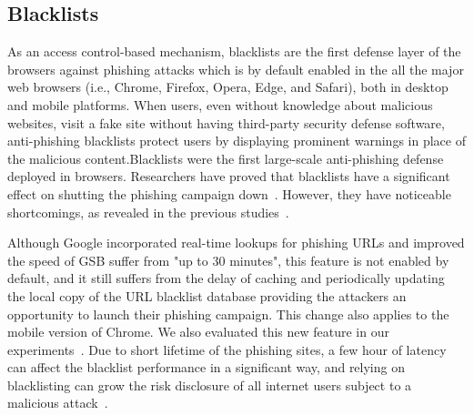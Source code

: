 \documentclass[letterpaper,twocolumn,10pt]{article}
\begin{document}
\subsection{Blacklists}

As an access control-based mechanism, blacklists are the first defense layer of the browsers against phishing attacks which is by default enabled in the all the major web browsers (i.e., Chrome, Firefox, Opera, Edge, and Safari), both in desktop and mobile platforms.
When users, even without knowledge about malicious websites, visit a fake site without having third-party security defense software, anti-phishing blacklists protect users by displaying prominent warnings in place of the malicious content.Blacklists were the first large-scale anti-phishing defense deployed in browsers. 
Researchers have proved that blacklists have a significant effect on shutting the phishing campaign down~\cite{sheng2009empirical}.
However, they have noticeable shortcomings, as revealed in the previous studies~\cite{oest2020sunrise}.

Although Google incorporated real-time lookups for phishing URLs and improved the speed of GSB suffer from "up to 30 minutes", this feature is not enabled by default, and it still suffers from the delay of caching and periodically updating the local copy of the URL blacklist database providing the attackers an opportunity to launch their phishing campaign. This change also applies to the mobile version of Chrome. We also evaluated this new feature in our experiments~\cite{google-online-security-blog-2019}. Due to short lifetime of the phishing sites, a few hour of latency can affect the blacklist performance in a significant way, and relying on blacklisting can grow the risk disclosure of all internet users subject to a malicious attack~\cite{oest2020sunrise,sheng2009empirical}.



\end{document}
